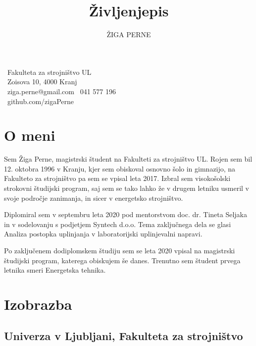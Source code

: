 \documentclass{article}
\begin{document}
\title{Življenjepis}
\author{ŽIGA PERNE}

\renewcommand{\maketitle}{
\begin{center}
{\huge\bfseries
\theauthor}
\linebreak

\faGraduationCap \  Fakulteta za strojništvo UL\\
\faMapMarker\  Zoisova 10, 4000 Kranj\\
\faEnvelopeO \  ziga.perne@gmail.com \faPhone \  041 577 196\\
\faGithub \ github.com/zigaPerne

\vspace{1cm}


\end{center}
}

\maketitle

\section{O meni}
Sem Žiga Perne, magistrski študent na Fakulteti za strojništvo UL. Rojen sem bil 12. oktobra 1996 v Kranju, kjer sem obiskoval osnovno šolo in gimnazijo, na Fakulteto za strojništvo pa sem se vpisal leta 2017. Izbral sem visokošolski strokovni študijski program, saj sem se tako lahko že v drugem letniku usmeril v svoje področje zanimanja, in sicer v energetsko strojništvo.

Diplomiral sem v septembru leta 2020 pod mentorstvom doc. dr. Tineta Seljaka in v sodelovanju s podjetjem Syntech d.o.o. Tema zaključnega dela se glasi Analiza postopka uplinjanja v laboratorijski uplinjevalni napravi.

Po zaključenem dodiplomskem študiju sem se leta 2020 vpisal na magistrski študijski program, katerega obiskujem še danes. Trenutno sem študent prvega letnika smeri Energetska tehnika. 



\section{Izobrazba}

\subsection{Univerza v Ljubljani, Fakulteta za strojništvo}
\end{document}
